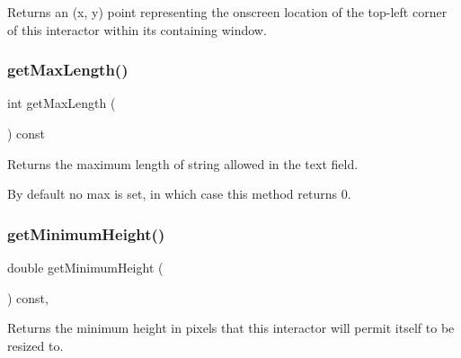 Returns an (x, y) point representing the onscreen location of the top-\/left corner of this interactor within its containing window. 

\mbox{\label{classsgl_1_1GTextField_a465e41b66da9e75443bf0b7951582468}} 
\subsubsection{\texorpdfstring{get\+Max\+Length()}{getMaxLength()}}
{\footnotesize\ttfamily int get\+Max\+Length (\begin{DoxyParamCaption}{ }\end{DoxyParamCaption}) const\hspace{0.3cm}{\ttfamily [virtual]}}



Returns the maximum length of string allowed in the text field. 

By default no max is set, in which case this method returns 0. \mbox{\label{classsgl_1_1GInteractor_aed4b0075fcc434499c3cb3e46896bda3}} 
\subsubsection{\texorpdfstring{get\+Minimum\+Height()}{getMinimumHeight()}}
{\footnotesize\ttfamily double get\+Minimum\+Height (\begin{DoxyParamCaption}{ }\end{DoxyParamCaption}) const\hspace{0.3cm}{\ttfamily [virtual]}, {\ttfamily [inherited]}}



Returns the minimum height in pixels that this interactor will permit itself to be resized to. 

\mbox{\label{classsgl_1_1GInteractor_a66b5af0b32493b4d597ca0a3df2049ea}} 
